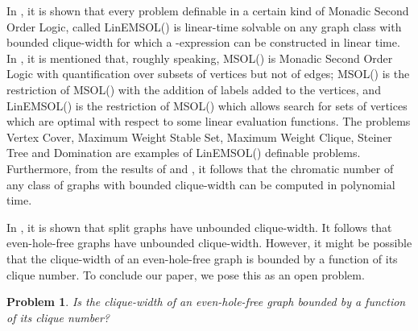 \documentclass[11pt,a4paper]{article}
\newtheorem{problem}{Problem}[section]
\begin{document}
In \cite{CouMak2000}, it is shown that every problem definable in
a certain kind of Monadic Second Order Logic, called
LinEMSOL() is linear-time
solvable on any graph class with bounded clique-width for which a
-expression can be constructed in linear time. In
\cite{CouMak2000}, it is mentioned that, roughly speaking,
MSOL() is Monadic Second Order Logic with quantification
over subsets of vertices but not of edges; MSOL() is
the restriction of MSOL() with the addition of labels
added to the vertices, and LinEMSOL() is the
restriction of MSOL() which allows search for sets
of vertices which are optimal with respect to some linear
evaluation functions. The problems Vertex Cover, Maximum Weight
Stable Set, Maximum Weight Clique, Steiner Tree and Domination are
examples of LinEMSOL() definable problems. Furthermore,
from the results of \cite{Oum2008} and \cite{KobRot2003}, it
follows that the chromatic number of any class of graphs with
bounded clique-width can be computed in polynomial time.

In \cite{MakRot1999}, it is shown that split graphs have unbounded
clique-width. It follows that even-hole-free graphs have unbounded
clique-width. However, it might be possible that the clique-width
of an even-hole-free graph is bounded by a function of its clique
number. To conclude our paper, we pose this as an open problem.
\begin{problem}\label{pro:clique-width}
Is the clique-width of an even-hole-free graph bounded by a
function of its clique number?
\end{problem}
\end{document}
